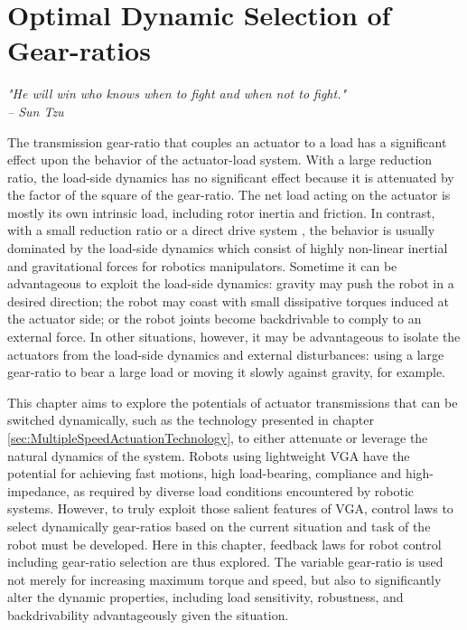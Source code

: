 \chapter{Optimal Dynamic Selection of Gear-ratios}  %
\label{sec:ControlAndPlanningOfRobotUsingVariableGearRatioActuators}


\begin{flushright}
\textit{"He will win who knows when to fight and when not to fight."} \\ \emph{-- Sun Tzu}
\end{flushright}
\vspace{10pt}

The transmission gear-ratio that couples an actuator to a load has a significant effect upon the behavior of the actuator-load system. With a large reduction ratio, the load-side dynamics has no significant effect because it is attenuated by the factor of the square of the gear-ratio. The net load acting on the actuator is mostly its own intrinsic load, including rotor inertia and friction. In contrast, with a small reduction ratio or a direct drive system \cite{asada_direct-drive_1987}, the behavior is usually dominated by the load-side dynamics which consist of highly non-linear inertial and gravitational forces for robotics manipulators. Sometime it can be advantageous to exploit the load-side dynamics: gravity may push the robot in a desired direction; the robot may coast with small dissipative torques induced at the actuator side; or the robot joints become backdrivable to comply to an external force. In other situations, however, it may be advantageous to isolate the actuators from the load-side dynamics and external disturbances: using a large gear-ratio to bear a large load or moving it slowly against gravity, for example.

This chapter aims to explore the potentials of actuator transmissions that can be switched dynamically, such as the technology presented in chapter \ref{sec:MultipleSpeedActuationTechnology}, to either attenuate or leverage the natural dynamics of the system. Robots using lightweight VGA have the potential for achieving fast motions, high load-bearing, compliance and high-impedance, as required by diverse load conditions encountered by robotic systems. However, to truly exploit those salient features of VGA, control laws to select dynamically gear-ratios based on the current situation and task of the robot must be developed. Here in this chapter, feedback laws for robot control including gear-ratio selection are thus explored. The variable gear-ratio is used not merely for increasing maximum torque and speed, but also to significantly alter the dynamic properties, including load sensitivity, robustness, and backdrivability advantageously given the situation.

